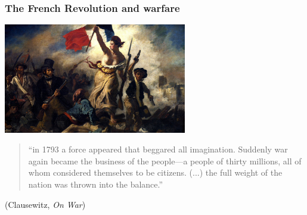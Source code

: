\documentclass[aspectratio=43, handout]{beamer}
\begin{document}
%
%

\begin{frame}
\frametitle{The French Revolution and warfare}
\centering

\includegraphics[width = 0.6\textwidth]{img/delacroix}


\vspace{15pt}

\begin{quote}
  {\small ``in 1793 a force appeared that beggared all imagination. Suddenly war again became the business of the people---a people of thirty millions, all of whom considered themselves to be citizens. (...) the full weight of the nation was thrown into the balance.''}
\end{quote}

{\small (Clausewitz, \textit{On War})}

\end{frame}
\end{document}
